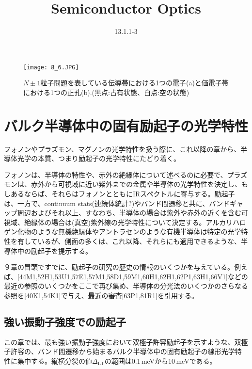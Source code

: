 \documentclass[11pt,a4j,uplatex]{jsarticle}
\title{Semiconductor Optics}
\author{13.1.1-3}
\begin{document}
 \maketitle %

 \thispagestyle{empty}%
 \clearpage
 \addtocounter{page}{-1}


 \tableofcontents %

 \thispagestyle{empty}%
 \clearpage
 \addtocounter{page}{-1}

\fi

\renewcommand{\figurename}{図}%
\setcounter{figure}{5}
\begin{figure}[tb]
  \centering
  \texttt{[image: 8\_6.JPG]}
  \caption{$N\pm1$粒子問題を表している伝導帯における1つの電子(a)と価電子帯における1つの正孔(b).(黒点:占有状態、白点:空の状態)}
  \label{8.6}
\end{figure}
\fi

\setcounter{section}{12}%
\setcounter{subsection}{0}
\setcounter{figure}{0}
\newpage
\section{バルク半導体中の固有励起子の光学特性}
フォノンやプラズモン、マグノンの光学特性を扱う際に、これ以降の章から、半導体光学の本質、つまり励起子の光学特性にたどり着く。

フォノンは、半導体の特性や、赤外の絶縁体について述べるのに必要で、プラズモンは、赤外から可視域に近い紫外までの金属や半導体の光学特性を決定し、もしあるならば、それらはフォノンとともにIRスペクトルに寄与する。励起子は、一方で、continuum stats(連続体統計?)やバンド間遷移と共に、バンドギャップ周辺およびそれ以上、すなわち、半導体の場合は紫外や赤外の近くを含む可視域、絶縁体の場合は(真空)紫外線の光学特性について決定する。アルカリハロゲン化物のような無機絶縁体やアントラセンのような有機半導体は特定の光学特性を有しているが、側面の多くは、これ以降、それらにも適用できるような、半導体中の励起子を提示する。

９章の冒頭ですでに、励起子の研究の歴史の情報のいくつかを与えている。例えば、[44M1,52H1,53U1,57E1,57M1,58D1,59M1,60H1,62H1,62P1,63H1,66V1]などの最近の参照のいくつかをここで再び集め、半導体の分光法のいくつかのさらなる参照を[40K1,54K1]で与え、最近の審査[63P1,81R1]を引用する。

\subsection{強い振動子強度での励起子}
この章では、最も強い振動子強度において双極子許容励起子を示すような、双極子許容の、バンド間遷移から始まるバルク半導体中の固有励起子の線形光学特性に集中する。縦横分裂の値$\Delta_{\mathrm{LT}}$の範囲は0.1\,meVから10\,meVである。
\end{document}
